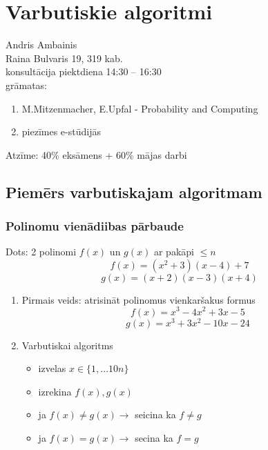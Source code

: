 \section{Varbutiskie algoritmi}
Andris Ambainis \\
Raina Bulvaris 19, 319 kab.\\
konsultācija piektdiena 14:30 -- 16:30 \\
\newline
grāmatas:
\begin{enumerate}
  \item M.Mitzenmacher, E.Upfal - Probability and Computing
  \item piezīmes e-stūdijās
\end{enumerate}

Atzīme: 40\% eksāmens + 60\% mājas darbi

\subsection{Piemērs varbutiskajam algoritmam}
\subsubsection{Polinomu vienādiibas pārbaude}
Dots: 2 polinomi $f(x)$ un $g(x)$ ar pakāpi $\le n$
$$ f(x) = (x^2 + 3)(x-4)+7 $$
$$ g(x) = (x+2) (x-3) (x+4) $$

\begin{enumerate}
  \item Pirmais veids: atrisināt polinomus vienkaršakus formus
  $$ f(x) = x^3 - 4x^2 + 3x -5 $$
  $$ g(x) = x^3 + 3x^2 - 10x -24 $$

  \item Varbutiskai algoritms
  \begin{itemize}
    \item izvelas $x \in \{1, ... 10n\}$
    \item izrekina $f(x), g(x)$
    \item ja $f(x) \ne g(x) \rightarrow $ seicina ka $f \ne g$
    \item ja $f(x) = g(x) \rightarrow $ secina ka $ f = g$
  \end{itemize}
  
\end{enumerate}

